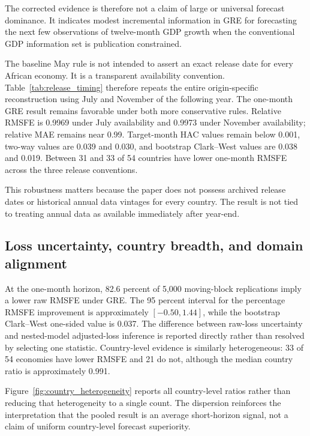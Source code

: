 \documentclass[preprint,12pt,authoryear]{elsarticle}
\begin{document}
The corrected evidence is therefore not a claim of large or universal forecast dominance. It indicates modest incremental information in GRE for forecasting the next few observations of twelve-month GDP growth when the conventional GDP information set is publication constrained.

The baseline May rule is not intended to assert an exact release date for every African economy. It is a transparent availability convention. Table~\ref{tab:release_timing} therefore repeats the entire origin-specific reconstruction using July and November of the following year. The one-month GRE result remains favorable under both more conservative rules. Relative RMSFE is 0.9969 under July availability and 0.9973 under November availability; relative MAE remains near 0.99. Target-month HAC values remain below 0.001, two-way values are 0.039 and 0.030, and bootstrap Clark--West values are 0.038 and 0.019. Between 31 and 33 of 54 countries have lower one-month RMSFE across the three release conventions.



This robustness matters because the paper does not possess archived release dates or historical annual data vintages for every country. The result is not tied to treating annual data as available immediately after year-end.

\subsection{Loss uncertainty, country breadth, and domain alignment}
At the one-month horizon, 82.6 percent of 5,000 moving-block replications imply a lower raw RMSFE under GRE. The 95 percent interval for the percentage RMSFE improvement is approximately $[-0.50,1.44]$, while the bootstrap Clark--West one-sided value is 0.037. The difference between raw-loss uncertainty and nested-model adjusted-loss inference is reported directly rather than resolved by selecting one statistic. Country-level evidence is similarly heterogeneous: 33 of 54 economies have lower RMSFE and 21 do not, although the median country ratio is approximately 0.991.

Figure~\ref{fig:country_heterogeneity} reports all country-level ratios rather than reducing that heterogeneity to a single count. The dispersion reinforces the interpretation that the pooled result is an average short-horizon signal, not a claim of uniform country-level forecast superiority.
\end{document}
